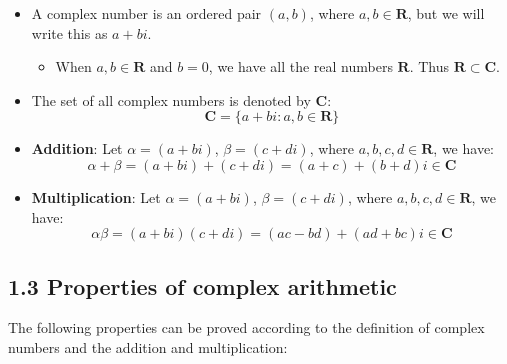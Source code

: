 \documentclass[12pt, letterpaper, oneside]{book}
\begin{document}
\begin{itemize}
  \item A complex number is an ordered pair $(a, b)$, where $a, b \in
    \mathbf{R}$, but we will write this as $a + bi$.
    \begin{itemize}
      \item When $a, b \in \mathbf{R}$ and $b = 0$, we have all the real
        numbers $\mathbf{R}$. Thus $\mathbf{R} \subset \mathbf{C}$.
    \end{itemize}
  \item The set of all complex numbers is denoted by $\mathbf{C}$:
    \[ \mathbf{C} = \{a + bi: a, b \in \mathbf{R}\} \]
  \item \textbf{Addition}: Let $\alpha = (a + bi)$, $\beta = (c + di)$, where
    $a, b, c, d \in \mathbf{R}$, we have:
    \[
      \alpha + \beta = (a + bi) + (c + di) = (a + c) + (b + d)i \in \mathbf{C}
    \]
  \item \textbf{Multiplication}: Let $\alpha = (a + bi)$, $\beta = (c + di)$,
    where $a, b, c, d \in \mathbf{R}$, we have:
    \[
      \alpha\beta = (a + bi)(c + di) = (ac - bd) + (ad + bc)i \in \mathbf{C}
    \]
\end{itemize}

\subsection{1.3 Properties of complex arithmetic}

The following properties can be proved according to the definition of complex
numbers and the addition and multiplication:
\end{document}
